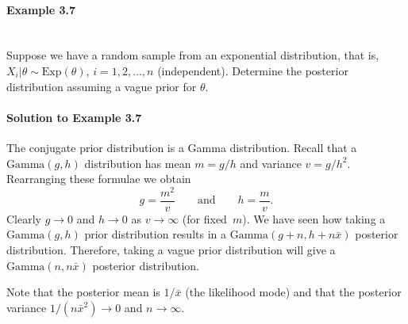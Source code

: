 \newpage

\paragraph{Example 3.7}{~\\
Suppose we have a random sample from an exponential distribution, that is, $X_i|\theta\sim \text{Exp}(\theta)$, $i=1,2,\ldots,n$ (independent). Determine the posterior distribution assuming a vague
prior for $\theta$.

\paragraph{Solution to Example 3.7}{
    
        The conjugate prior distribution is a Gamma distribution. Recall that a $\text{Gamma}(g,h)$ distribution has mean $m=g/h$ and variance $v=g/h^2$. Rearranging these formulae we obtain
        \begin{equation*}
        g=\frac{m^2}{v}\quad\quad\text{and}\quad\quad h=\frac{m}{v}. 
        \end{equation*}
        Clearly $g\to 0$ and $h\to 0$ as $v\to\infty$ (for fixed~$m$).  We have seen how taking a $\text{Gamma}(g,h)$ prior distribution results in a $\text{Gamma}(g+n,h+n\bar x)$ posterior distribution. Therefore, taking a vague prior distribution will give a $\text{Gamma}(n,n\bar x)$ posterior distribution. 
        
        Note that the posterior mean is $1/\bar x$ (the likelihood mode) and that the posterior variance $1/(n\bar x^2)\to 0$ and $n\to\infty$.
        
        
    
}}

\clearpage

